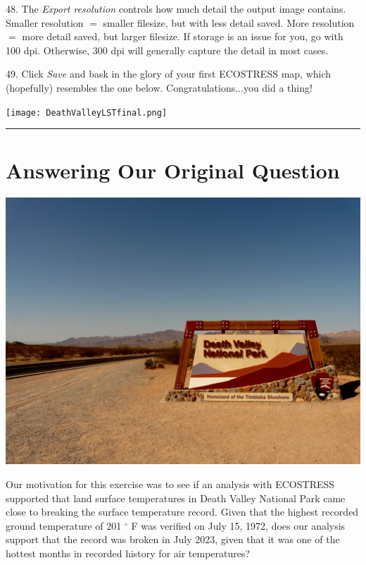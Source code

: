 \documentclass[oneside,a4paper,11pt,explicit]{book}
\begin{document}
48. The \textit{Export resolution} controls how much detail the output image contains. Smaller resolution $=$ smaller filesize, but with less detail saved. More resolution $=$ more detail saved, but larger filesize. If storage is an issue for you, go with 100 dpi. Otherwise, 300 dpi will generally capture the detail in most cases.

49. Click \textit{Save} and bask in the glory of your first ECOSTRESS map, which (hopefully) resembles the one below. Congratulations...you did a thing!


\centerline{\texttt{[image: DeathValleyLSTfinal.png]}}

\vspace{.25em}

\hrule

\section{Answering Our Original Question}

\centerline{\includegraphics[width=.75\textwidth]{DeathValleySign.jpg}}

Our motivation for this exercise was to see if an analysis with ECOSTRESS supported that land surface temperatures in Death Valley National Park came close to breaking the surface temperature record. Given that the highest recorded ground temperature of 201 $^{\circ}$ F was verified on July 15, 1972, does our analysis support that the record was broken in July 2023, given that it was one of the hottest months in recorded history for air temperatures?

\end{document}
